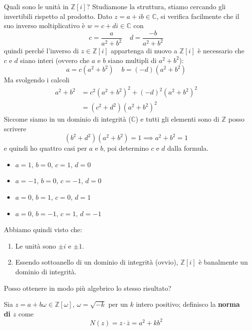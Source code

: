 \begin{osservazione} 
	Quali sono le unità in $\mathbb{Z}[i]$? Studiamone la struttura, stiamo cercando gli invertibili rispetto al prodotto.
	Dato $z=a+ib\in\mathbb{C}$, si verifica facilmente che il suo inverso moltiplicativo è $w=c+di\in\mathbb{C}$ con
		\begin{equation*}
			c=\frac{a}{a^2+b^2} \ \ \ \ \ d = \frac{-b}{a^2+b^2}
		\end{equation*}
		quindi perché l'inverso di $z\in\mathbb{Z}[i]$ appartenga di nuovo a $\mathbb{Z}[i]$ è necessario che $c$ e $d$ siano interi (ovvero che $a$ e $b$ siano multipli di $a^2+b^2$):
		\begin{equation*}
			a=c(a^2+b^2) \ \ \ \ \ b=(-d)(a^2+b^2)
		\end{equation*}
		Ma svolgendo i calcoli
		\begin{align*}
			a^2+b^2
			&=c^2(a^2+b^2)^2+(-d)^2(a^2+b^2)^2 \\ 
			&=(c^2+d^2)(a^2+b^2)^2
		\end{align*}
		Siccome siamo in un dominio di integrità ($\mathbb{C}$) e tutti gli elementi sono di $\mathbb{Z}$ posso scrivere
		\begin{equation*}
			(b^2+d^2)(a^2+b^2)=1 \implies a^2+b^2=1
		\end{equation*}
		e quindi ho quattro casi per $a$ e $b$, poi determino $c$ e $d$ dalla formula.
		\begin{itemize}
			\item $a=1$, $b=0$, $c=1$, $d=0$
			\item $a=-1$, $b=0$, $c=-1$, $d=0$
			\item $a=0$, $b=1$, $c=0$, $d=1$
			\item $a=0$, $b=-1$, $c=1$, $d=-1$
		\end{itemize}
	Abbiamo quindi visto che:
		\begin{enumerate}
		\item Le unità sono $\pm i$ e $\pm 1$.
		\item Essendo sottoanello di un dominio di integrità (ovvio), $\mathbb{Z}[i]$ è banalmente un dominio di integrità.
	\end{enumerate}
	Posso ottenere in modo più algebrico lo stesso risultato?
\end{osservazione}
\begin{definizione}
	Sia $z=a+b\omega\in\mathbb{Z}[\omega]$, $\omega=\sqrt{-k}$ per un $k$ intero positivo; definisco la \textbf{norma di $z$} come 
	\begin{equation*}
	N(z)=z\cdot\overline{z}=a^2+kb^2
	\end{equation*}
\end{definizione}
